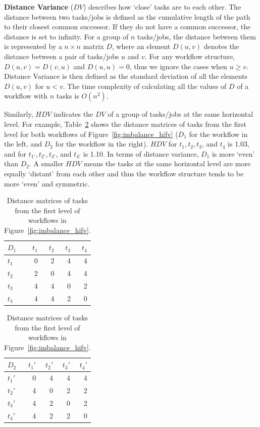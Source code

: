 \documentclass[final,5p,times,twocolumn]{elsarticle}
\begin{document}
\textbf{Distance Variance} ($DV$) describes how `close' tasks are to each other. The distance between two tasks/jobs is defined as the cumulative length of the path to their closest common successor. If they do not have a common successor, the distance is set to infinity. For a group of $n$ tasks/jobs, the distance between them is represented by a $n \times n$ matrix $D$, where an element $D(u,v)$ denotes the distance between a pair of tasks/jobs $u$ and $v$. For any workflow structure, $D(u,v)=D(v,u)$ and $D(u,u)=0$, thus we ignore the cases when $u \geq v$. Distance Variance is then defined as the standard deviation of all the elements $D(u,v)$ for $u<v$. The time complexity of calculating all the values of $D$ of a workflow with $n$ tasks is $O(n^2)$. 

Similarly, $HDV$ indicates the $DV$ of a group of tasks/jobs at the same horizontal level. For example, Table~\ref{tab:imblance_metric} shows the distance matrices of tasks from the first level for both workflows of Figure~\ref{fig:imbalance_hifv} ($D_1$ for the workflow in the left, and $D_2$ for the workflow in the right). $HDV$ for $t_1, t_2, t_3$, and $t_4$ is 1.03, and for $t_{1'}, t_{2'}, t_{3'}$, and $t_{4'}$ is 1.10. In terms of distance variance, $D_1$ is more `even' than $D_2$. A smaller $HDV$ means the tasks at the same horizontal level are more equally `distant' from each other and thus the workflow structure tends to be more `even' and symmetric. 

\begin{table}[htb]
	\footnotesize
	\centering
	\begin{tabular}{l|rrrr}
		$D_1$ & $t_1$ & $t_2$ & $t_3$ &$t_4$\\
		\hline
		$t_1$ & 0 & 2 & 4 & 4 \\
		$t_2$ & 2 & 0 & 4 & 4 \\
		$t_3$ & 4 & 4 & 0 & 2\\
		$t_4$ & 4 & 4 & 2 & 0 \\
	\end{tabular}
	\quad
	\begin{tabular}{l|rrrr}
		$D_2$ & $t_1'$ & $t_2'$ & $t_3'$ &$t_4'$\\
		\hline
		$t_1'$ & 0 & 4 & 4 & 4 \\
		$t_2'$ & 4 & 0 & 2 & 2 \\
		$t_3'$ & 4 & 2 & 0 & 2\\
		$t_4'$ & 4 & 2 & 2 & 0 \\
	\end{tabular}
	\caption{Distance matrices of tasks from the first level of workflows in Figure~\ref{fig:imbalance_hifv}.}
	\label{tab:imblance_metric}
\end{table}
\end{document}
